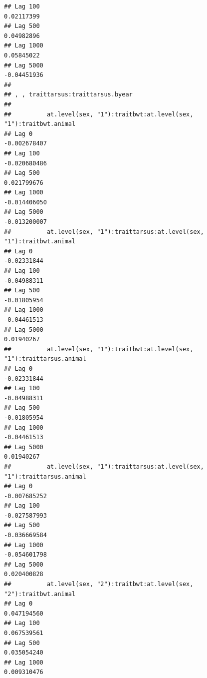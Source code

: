 \documentclass[
  12pt,
]{book}
\begin{document}
\begin{verbatim}
## Lag 100                                                           0.02117399
## Lag 500                                                           0.04982896
## Lag 1000                                                          0.05845022
## Lag 5000                                                         -0.04451936
## 
## , , traittarsus:traittarsus.byear
## 
##          at.level(sex, "1"):traitbwt:at.level(sex, "1"):traitbwt.animal
## Lag 0                                                      -0.002678407
## Lag 100                                                    -0.020680486
## Lag 500                                                     0.021799676
## Lag 1000                                                   -0.014406050
## Lag 5000                                                   -0.013200007
##          at.level(sex, "1"):traittarsus:at.level(sex, "1"):traitbwt.animal
## Lag 0                                                          -0.02331844
## Lag 100                                                        -0.04988311
## Lag 500                                                        -0.01805954
## Lag 1000                                                       -0.04461513
## Lag 5000                                                        0.01940267
##          at.level(sex, "1"):traitbwt:at.level(sex, "1"):traittarsus.animal
## Lag 0                                                          -0.02331844
## Lag 100                                                        -0.04988311
## Lag 500                                                        -0.01805954
## Lag 1000                                                       -0.04461513
## Lag 5000                                                        0.01940267
##          at.level(sex, "1"):traittarsus:at.level(sex, "1"):traittarsus.animal
## Lag 0                                                            -0.007685252
## Lag 100                                                          -0.027587993
## Lag 500                                                          -0.036669584
## Lag 1000                                                         -0.054601798
## Lag 5000                                                          0.020400828
##          at.level(sex, "2"):traitbwt:at.level(sex, "2"):traitbwt.animal
## Lag 0                                                       0.047194560
## Lag 100                                                     0.067539561
## Lag 500                                                     0.035054240
## Lag 1000                                                    0.009310476

\end{verbatim}
\end{document}
